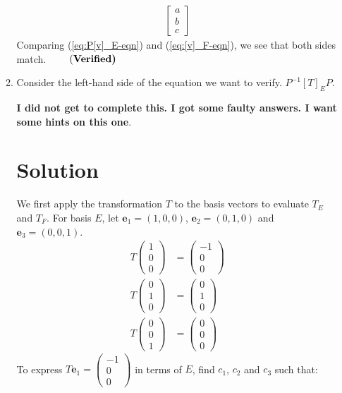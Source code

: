 \begin{enumerate}
\begin{enumerate}[label={(\alph*)}]
\begin{align}
\begin{bmatrix}
    a \\
    b \\
    c \end{bmatrix}\label{eq:[v]_F-eqn}
\end{align}
Comparing (\ref{eq:P[v]_E-eqn}) and (\ref{eq:[v]_F-eqn}), we see that both sides match. $\qquad\text{(\bf Verified)}$
    \bigskip\bigskip\hline\hline\bigskip
    \item Consider the left-hand side of the equation we want to verify. $\displaystyle P^{-1}[T]_E P$. 
    
    \textbf{I did not get to complete this. I got some faulty answers. I want some hints on this one}. 
    \section*{Solution}
    We first apply the transformation $T$ to the basis vectors to evaluate $T_E$ and $T_F$. For basis $E$, let $\mathbf{e}_1 = (1,0,0)$, $\mathbf{e}_2 = (0,1,0)$ and $\mathbf{e}_3 = (0,0,1)$.
    \begin{align*}
        T \begin{pmatrix} 1 \\ 0 \\ 0 \end{pmatrix} &= \begin{pmatrix} -1 \\ 0 \\ 0 \end{pmatrix}\\
        T \begin{pmatrix} 0 \\ 1 \\ 0 \end{pmatrix} &= \begin{pmatrix} 0 \\ 1 \\ 0 \end{pmatrix}\\
        T \begin{pmatrix} 0 \\ 0 \\ 1 \end{pmatrix} &= \begin{pmatrix} 0 \\ 0 \\ 0 \end{pmatrix}
    \end{align*}
    To express $T \mathbf{e}_1 = \begin{pmatrix} -1 \\ 0 \\ 0 \end{pmatrix}$ in terms of $E$, find $c_1$, $c_2$ and $c_3$ such that:

\end{enumerate}
\end{enumerate}
